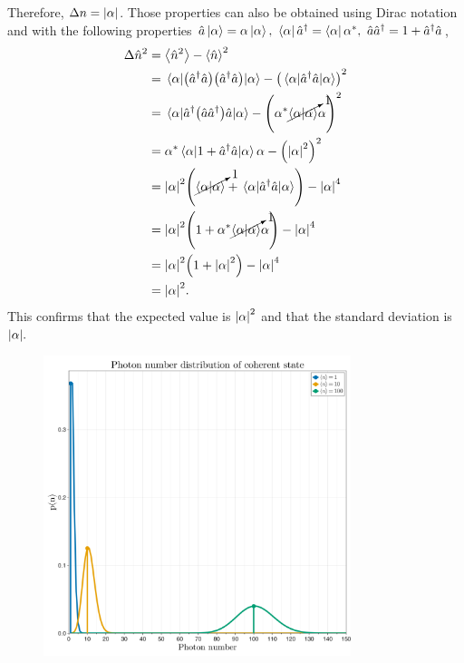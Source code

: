 \documentclass[../main.tex]{subfiles}
\begin{document}
Therefore, $\Delta n=\abs{\alpha}$.
Those properties can also be obtained using Dirac notation and with the following properties $\hat{a}\ket{\alpha}=\alpha\ket{\alpha},~\bra{\alpha}\hat{a}^\dagger=\bra{\alpha}\alpha^*,~\hat{a}\hat{a}^\dagger=1+\hat{a}^\dagger\hat{a}$,
\begin{align*}
    \Delta\hat{n}^2 &= \expval{\hat{n}^2} - \expval{\hat{n}}^2 \\ 
                    &= \expval{\qty(\hat{a}^\dagger\hat{a})\qty(\hat{a}^\dagger\hat{a})}{\alpha} - \qty(\expval{\hat{a}^\dagger\hat{a}}{\alpha})^2 \\
                    &= \expval{\hat{a}^\dagger\qty(\hat{a}\hat{a}^\dagger)\hat{a}}{\alpha} - \qty(\alpha^*\cancelto{1}{\braket{\alpha}}\alpha)^2 \\
                    &= \alpha^*\expval{1+\hat{a}^\dagger\hat{a}}{\alpha}\alpha - \qty(\abs{\alpha}^2)^2 \\
                    &= \abs{\alpha}^2\qty(\cancelto{1}{\braket{\alpha}}+\expval{\hat{a}^\dagger\hat{a}}{\alpha}) - \abs{\alpha}^4 \\
                    &= \abs{\alpha}^2\qty(1+\alpha^*\cancelto{1}{\braket{\alpha}}\alpha) - \abs{\alpha}^4 \\
                    &= \abs{\alpha}^2\qty(1+\abs{\alpha}^2) - \abs{\alpha}^4 \\
                    &= \abs{\alpha}^2.
\end{align*}
This confirms that the expected value is $\abs{\alpha}^2$ and that the standard deviation is $\abs{\alpha}.$

\begin{figure}[ht!]
    \centering
    \includegraphics[width=0.8\textwidth]{imgs/fig_coherent.png}
\end{figure}
\end{document}

